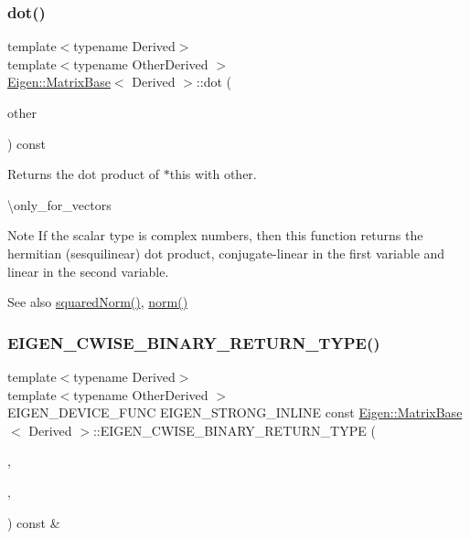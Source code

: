 \subsubsection{\texorpdfstring{dot()}{dot()}}
{\footnotesize\ttfamily template$<$typename Derived$>$ \\
template$<$typename Other\+Derived $>$ \\
\mbox{\hyperlink{class_eigen_1_1_matrix_base}{Eigen\+::\+Matrix\+Base}}$<$ Derived $>$\+::dot (\begin{DoxyParamCaption}\item[{const \mbox{\hyperlink{class_eigen_1_1_matrix_base}{Matrix\+Base}}$<$ Other\+Derived $>$ \&}]{other }\end{DoxyParamCaption}) const}

\begin{DoxyReturn}{Returns}
the dot product of $\ast$this with other.
\end{DoxyReturn}
\textbackslash{}only\+\_\+for\+\_\+vectors

\begin{DoxyNote}{Note}
If the scalar type is complex numbers, then this function returns the hermitian (sesquilinear) dot product, conjugate-\/linear in the first variable and linear in the second variable.
\end{DoxyNote}
\begin{DoxySeeAlso}{See also}
\mbox{\hyperlink{class_eigen_1_1_matrix_base_a8782faeb21e43908cdce47cec06fba23}{squared\+Norm()}}, \mbox{\hyperlink{class_eigen_1_1_matrix_base_a5f6a3bc46add1f2e879ce15040e6987e}{norm()}} 
\end{DoxySeeAlso}
\mbox{\label{class_eigen_1_1_matrix_base_a297d68d9d1134a4da3dcee9dd9d6857d}} 
\subsubsection{\texorpdfstring{EIGEN\_CWISE\_BINARY\_RETURN\_TYPE()}{EIGEN\_CWISE\_BINARY\_RETURN\_TYPE()}}
{\footnotesize\ttfamily template$<$typename Derived$>$ \\
template$<$typename Other\+Derived $>$ \\
E\+I\+G\+E\+N\+\_\+\+D\+E\+V\+I\+C\+E\+\_\+\+F\+U\+NC E\+I\+G\+E\+N\+\_\+\+S\+T\+R\+O\+N\+G\+\_\+\+I\+N\+L\+I\+NE const \mbox{\hyperlink{class_eigen_1_1_matrix_base}{Eigen\+::\+Matrix\+Base}}$<$ Derived $>$\+::E\+I\+G\+E\+N\+\_\+\+C\+W\+I\+S\+E\+\_\+\+B\+I\+N\+A\+R\+Y\+\_\+\+R\+E\+T\+U\+R\+N\+\_\+\+T\+Y\+PE (\begin{DoxyParamCaption}\item[{Derived}]{,  }\item[{Other\+Derived}]{,  }\item[{product}]{ }\end{DoxyParamCaption}) const \&\hspace{0.3cm}{\ttfamily [inline]}}

